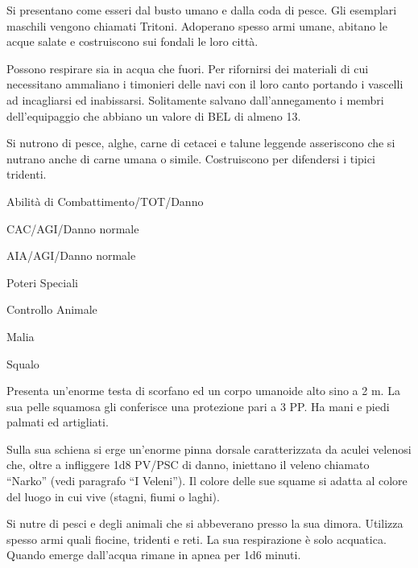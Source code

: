 
Si presentano come esseri dal busto umano e dalla coda di pesce.  Gli
esemplari maschili vengono chiamati Tritoni. Adoperano spesso armi
umane, abitano le acque salate e costruiscono sui fondali le loro
citt\`a.

Possono respirare sia in acqua che fuori. Per rifornirsi dei materiali
di cui necessitano ammaliano i timonieri delle navi con il loro canto
portando i vascelli ad incagliarsi ed inabissarsi. Solitamente salvano
dall'annegamento i membri dell'equipaggio che abbiano un valore di BEL
di almeno 13.

Si nutrono di pesce, alghe, carne di cetacei e talune leggende
asseriscono che si nutrano anche di carne umana o simile. Costruiscono
per difendersi i tipici tridenti.


\begin{parmostro}{Abilit\`a di Combattimento/TOT/Danno}
\item CAC/AGI/Danno normale
\item AIA/AGI/Danno normale
\end{parmostro}

\begin{parmostro}{Poteri Speciali}
\item Controllo Animale
\item Malia
\item Squalo
\end{parmostro}


Presenta un'enorme testa di scorfano ed un corpo umanoide alto sino a
2 m. La sua pelle squamosa gli conferisce una protezione pari a 3
PP. Ha mani e piedi palmati ed artigliati.

Sulla sua schiena si erge un'enorme pinna dorsale caratterizzata da
aculei velenosi che, oltre a infliggere 1d8 PV/PSC di danno, iniettano
il veleno chiamato ``Narko'' (vedi paragrafo ``I Veleni''). Il colore
delle sue squame si adatta al colore del luogo in cui vive (stagni,
fiumi o laghi).

Si nutre di pesci e degli animali che si abbeverano presso la sua
dimora. Utilizza spesso armi quali fiocine, tridenti e reti. La sua
respirazione \`e solo acquatica. Quando emerge dall'acqua rimane in
apnea per 1d6 minuti.

